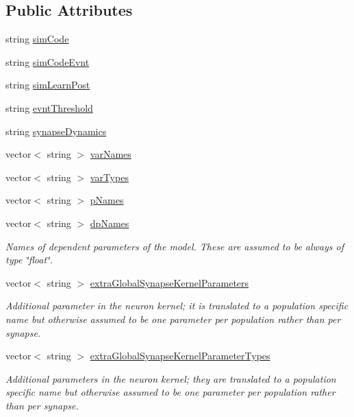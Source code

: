 \subsection*{Public Attributes}
\begin{DoxyCompactItemize}
\item 
string \hyperlink{classweightUpdateModel_a6f665453175451356bbf14b9f60baed3}{sim\+Code}
\item 
string \hyperlink{classweightUpdateModel_a758cc3211ae12407583f625418dd5a89}{sim\+Code\+Evnt}
\item 
string \hyperlink{classweightUpdateModel_a9ebdfd1b336b3c40403546deb05cbfc9}{sim\+Learn\+Post}
\item 
string \hyperlink{classweightUpdateModel_acccf120c9b1307f7ee2c5bac43110be1}{evnt\+Threshold}
\item 
string \hyperlink{classweightUpdateModel_a8f5c92fc0ca6c1ddf861891bfd751de2}{synapse\+Dynamics}
\item 
vector$<$ string $>$ \hyperlink{classweightUpdateModel_a130dc4796aef818562cd9ab112a6dc98}{var\+Names}
\item 
vector$<$ string $>$ \hyperlink{classweightUpdateModel_a77fdb9d1287b883d227f1b50fef9889c}{var\+Types}
\item 
vector$<$ string $>$ \hyperlink{classweightUpdateModel_a991eb286139c935b39e0af71e5b85ec6}{p\+Names}
\item 
vector$<$ string $>$ \hyperlink{classweightUpdateModel_a508c032f1c92f8d3da42dfa9209f0eb8}{dp\+Names}
\begin{DoxyCompactList}\small\item\em Names of dependent parameters of the model. These are assumed to be always of type \char`\"{}float\char`\"{}. \end{DoxyCompactList}\item 
vector$<$ string $>$ \hyperlink{classweightUpdateModel_aeab0e4003100c943d2ddcd3481f5f660}{extra\+Global\+Synapse\+Kernel\+Parameters}
\begin{DoxyCompactList}\small\item\em Additional parameter in the neuron kernel; it is translated to a population specific name but otherwise assumed to be one parameter per population rather than per synapse. \end{DoxyCompactList}\item 
vector$<$ string $>$ \hyperlink{classweightUpdateModel_a3e8b0003232bcbdf1be31425d87eb233}{extra\+Global\+Synapse\+Kernel\+Parameter\+Types}
\begin{DoxyCompactList}\small\item\em Additional parameters in the neuron kernel; they are translated to a population specific name but otherwise assumed to be one parameter per population rather than per synapse. \end{DoxyCompactList}\item 

\end{DoxyCompactItemize}

